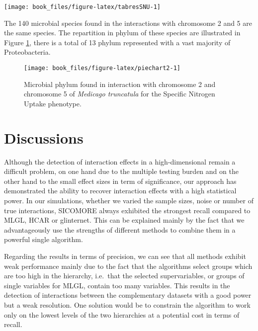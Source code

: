 \documentclass[]{book}
\begin{document}
\begin{center}\texttt{[image: book\_files/figure-latex/tabresSNU-1]} \end{center}

The 140 microbial species found in the interactions with chromosome 2
and 5 are the same species. The repartition in phylum of these species
are illustrated in Figure \ref{fig:piechart2}, there is a total of 13
phylum represented with a vast majority of Proteobacteria.



\begin{figure}

{\centering \texttt{[image: book\_files/figure-latex/piechart2-1]} 

}

\caption{Microbial phylum found in interaction with chromosome 2 and chromosome 5 of \emph{Medicago truncatula} for the Specific Nitrogen Uptake phenotype.}\label{fig:piechart2}
\end{figure}

\hypertarget{discussions-1}{%
\section{Discussions}\label{discussions-1}}

Although the detection of interaction effects in a high-dimensional
remain a difficult problem, on one hand due to the multiple testing
burden and on the other hand to the small effect sizes in term of
significance, our approach has demonstrated the ability to recover
interaction effects with a high statistical power. In our simulations,
whether we varied the sample sizes, noise or number of true
interactions, SICOMORE always exhibited the strongest recall compared to
MLGL, HCAR or glinternet. This can be explained mainly by the fact that
we advantageously use the strengths of different methods to combine them
in a powerful single algorithm.

Regarding the results in terms of precision, we can see that all methods
exhibit weak performance mainly due to the fact that the algorithms
select groups which are too high in the hierarchy, i.e.~that the
selected supervariables, or groups of single variables for MLGL, contain
too many variables. This results in the detection of interactions
between the complementary datasets with a good power but a weak
resolution. One solution would be to constrain the algorithm to work
only on the lowest levels of the two hierarchies at a potential cost in
terms of recall.
\end{document}
